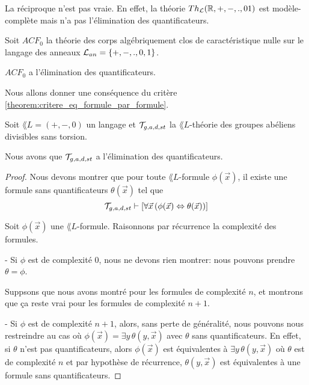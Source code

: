 \documentclass[a4paper, 12pt]{report}
\begin{document}
\begin{remarque}
	La réciproque n'est pas vraie. En effet, la théorie $Th_{\mathcal{L}}(\mathbb{R}, +,
	-, ., 0 1)$ est modèle-complète mais n'a pas l'élimination des
	quantificateurs.
\end{remarque}

\begin{exemple}
	Soit $ACF_{0}$ la théorie des corps algébriquement clos de caractéristique
	nulle sur le langage des anneaux $\mathcal{L}_{an} = \left\{ +, -, ., 0, 1 \right\}$.

	$ACF_{0}$ a l'élimination des quantificateurs.
\end{exemple}

Nous allons donner une conséquence du critère
\ref{theorem:critere_eq_formule_par_formule}.

\begin{proposition}
	Soit $\lang{L} = (+, -, 0)$ un langage et $\mathcal{T}_{g, a, d, st}$ la
	$\lang{L}$-théorie des groupes abéliens divisibles sans torsion.

	Nous avons que $\mathcal{T}_{g, a, d, st}$ a l'élimination des
	quantificateurs.
\end{proposition}

\ifdefined\outputproof
\begin{proof}
	Nous devons montrer que pour toute $\lang{L}$-formule $\phi(\vec{x})$, il existe une
	formule sans quantificateurs $\theta(\vec{x})$ tel que
	\begin{equation}
		\mathcal{T}_{g, a, d, st} \vdash [\forall \vec{x} \, (\phi(\vec{x})
		\Leftrightarrow \theta(\vec{x}))]
	\end{equation}

	Soit $\phi(\vec{x})$ une $\lang{L}$-formule.
	Raisonnons par récurrence la complexité des formules.

	- Si $\phi$ est de complexité $0$, nous ne devons rien montrer: nous pouvons
	prendre $\theta = \phi$.

	Suppsons que nous avons montré pour les formules de complexité $n$, et
	montrons que ça reste vrai pour les formules de complexité $n + 1$.

	- Si $\phi$ est de complexité $n + 1$, alors, sans perte de généralité, nous
	pouvons nous restreindre au cas où $\phi(\vec{x}) = \exists y \, \theta(y,
	\vec{x})$ avec $\theta$ sans quantificateurs.
	En effet, si $\theta$ n'est pas quantificateurs, alors $\phi(\vec{x})$ est
	équivalentes à $\exists y \, \theta(y, \vec{x})$ où $\theta$ est de
	complexité $n$ et par hypothèse de récurrence, $\theta(y, \vec{x})$ est
	équivalentes à une formule sans quantificateurs.

\end{proof}
\fi
\end{document}
